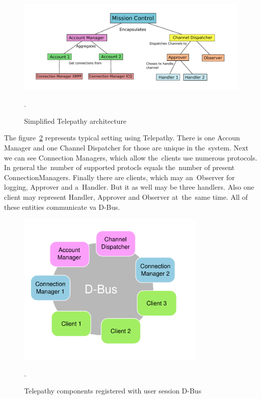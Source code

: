 \begin{figure}[ht]
	\begin{center}
	\includegraphics[width=15cm]{fig/telepathy-architecture.pdf}
	\caption{Simplified Telepathy architecture}.
	\label{fig:telepathy-architecture}
\end{center}
\end{figure}

The figure~\ref{fig:telepathyComponentsDbus} represents typical setting using Telepathy. There is one Accoun Manager and one Channel Dispatcher for those are unique in the~system. Next we can see Connection Managers, which allow the~clients use numerous protocols. In general the~number of supported protocls equals the~number of present ConnectionManagers. Finally there are clients, which may an~Observer for logging, Approver and a~Handler. But it as well may be three handlers. Also one client may represent Handler, Approver and Observer at~the~same time. All of these entities communicate va D-Bus.  

\begin{figure}[ht]
	\begin{center}
	\includegraphics[width=9cm]{fig/telepathy-components-dbus.png}
	\caption{Telepathy components registered with user session D-Bus \cite{TPWiki}}.
	\label{fig:telepathyComponentsDbus}
\end{center}
\end{figure}


